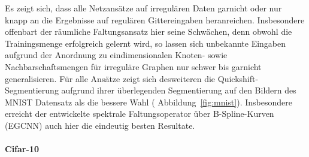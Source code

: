 Es zeigt sich, dass alle Netzansätze auf irregulären Daten garnicht oder nur knapp an die Ergebnisse auf regulären Gittereingaben heranreichen.
Insbesondere offenbart der räumliche Faltungsansatz hier seine Schwächen, denn obwohl die Trainingsmenge erfolgreich gelernt wird, so lassen sich unbekannte Eingaben aufgrund der Anordnung zu eindimensionalen Knoten- sowie Nachbarschaftsmengen für irreguläre Graphen nur schwer bis garnicht generalisieren.
Für alle Ansätze zeigt sich desweiteren die Quickshift-Segmentierung aufgrund ihrer überlegenden Segmentierung auf den Bildern des \gls{MNIST} Datensatz als die bessere Wahl (\vgl{} Abbildung~\ref{fig:mnist}).
Insbesondere erreicht der entwickelte spektrale Faltungsoperator über B-Spline-Kurven (\acs{EGCNN}) auch hier die eindeutig besten Resultate.

\paragraph{\gls{Cifar}-10}

